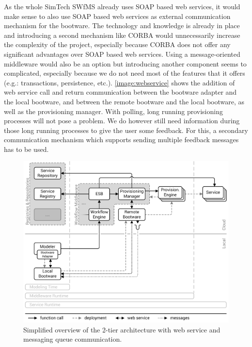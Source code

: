 As the whole SimTech SWfMS already uses SOAP based web services, it would make sense to also use SOAP based web services as external communication mechanism for the bootware.
The technology and knowledge is already in place and introducing a second mechanism like CORBA would unnecessarily increase the complexity of the project, especially because CORBA does not offer any significant advantages over SOAP based web services.
Using a message-oriented middleware would also be an option but introducing another component seems to complicated, especially because we do not need most of the features that it offers (e.g.: transactions, persistence, etc.).
\autoref{image:webservice} shows the addition of web service call and return communication between the bootware adapter and the local bootware, and between the remote bootware and the local bootware, as well as the provisioning manager.
With polling, long running provisioning processes will not pose a problem.
We do however still need information during those long running processes to give the user some feedback.
For this, a secondary communication mechanism which supports sending multiple feedback messages has to be used.

\begin{figure}[!htbp]
	\centering
	\includegraphics[resolution=600]{design/assets/message_queue}
	\caption{Simplified overview of the 2-tier architecture with web service and messaging queue communication.}
	\label{image:message_queue}
\end{figure}

